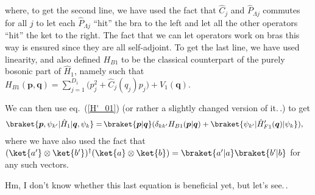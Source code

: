 \documentclass{report}
\begin{document}
where, to get the second line, we have used the fact that %
$\hat C_j$ and $\hat P_{\Lambda j}$ commutes %
for all $j$ to let each $\hat P_{\Lambda j}$ ``hit'' the bra to the left and let all the other operators ``hit'' the ket to the right. The fact that we can let operators work on bras this way is ensured since they are all self-adjoint. 
To get the last line, we have used linearity, and also defined $H_{B1}$ to be the classical counterpart of the purely bosonic part of $\hat H_1$, namely such that $H_{B1}(\boldsymbol{p}, \boldsymbol{q})= 
			\sum_{j=1}^{D_1} 
			\big( p_{j}^2 + \hat C_j(q_j) p_{j} \big) + 
			V_1(\boldsymbol{q})
$. 

We can then use eq.\ (\ref{H'_01}) (or rather a slightly changed version of it.\,.) to get
\begin{align}
\begin{aligned}
	\braket{\boldsymbol{p}, \psi_{k'} | \hat H_1 | \boldsymbol{q}, \psi_k} =&\,
		\braket{\boldsymbol{p} | \boldsymbol{q}}(
			\delta_{k k'} H_{B1}(\boldsymbol{p} | \boldsymbol{q}) +
			\braket{\psi_{k'} | \hat H_{F1}'(\boldsymbol{q}) | \psi_k}
		),
\end{aligned}
\end{align}
where we have also used the fact that $(\ket{a'} \otimes \ket{b'})^\dagger (\ket{a} \otimes \ket{b}) = \braket{a' | a} \braket{b' | b}$ for any such vectors.

Hm, I don't know whether this last equation is beneficial yet, but let's see.\,. 
\end{document}
